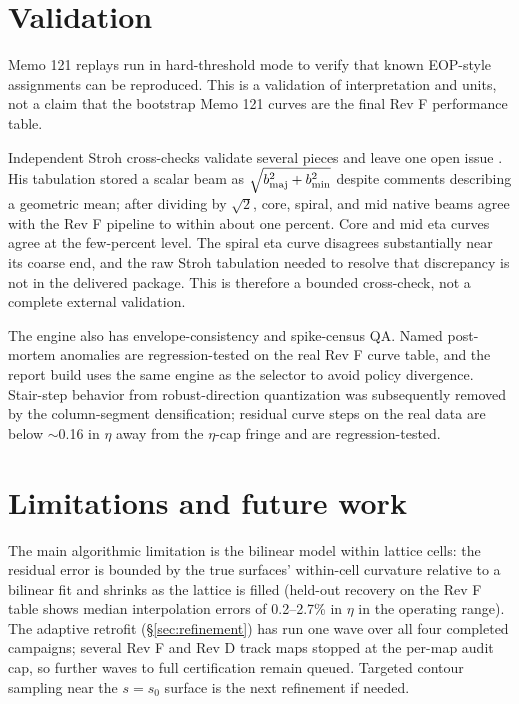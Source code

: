 \documentclass[11pt]{article}
\begin{document}
\section{Validation}
\label{sec:validation}

Memo 121 replays run in hard-threshold mode to verify that known EOP-style
assignments can be reproduced.  This is a validation of interpretation and
units, not a claim that the bootstrap Memo 121 curves are the final Rev F
performance table.

Independent Stroh cross-checks validate several pieces and leave one open
issue \cite{stroh}.  His tabulation stored a scalar beam as
$\sqrt{b_{\rm maj}^2+b_{\rm min}^2}$ despite comments describing a geometric
mean; after dividing by $\sqrt{2}$, core, spiral, and mid native beams agree
with the Rev F pipeline to within about one percent.  Core and mid eta curves
agree at the few-percent level.  The spiral eta curve disagrees substantially
near its coarse end, and the raw Stroh tabulation needed to resolve that
discrepancy is not in the delivered package.  This is therefore a bounded
cross-check, not a complete external validation.

The engine also has envelope-consistency and spike-census QA.  Named
post-mortem anomalies are regression-tested on the real Rev F curve table, and
the report build uses the same engine as the selector to avoid policy divergence.
Stair-step behavior from robust-direction quantization was subsequently
removed by the column-segment densification; residual curve steps on the real
data are below $\sim$0.16 in $\eta$ away from the $\eta$-cap fringe and are
regression-tested.

\section{Limitations and future work}
\label{sec:limitations}

The main algorithmic limitation is the bilinear model within lattice cells:
the residual error is bounded by the true surfaces' within-cell curvature
relative to a bilinear fit and shrinks as the lattice is filled (held-out
recovery on the Rev F table shows median interpolation errors of
0.2--2.7\% in $\eta$ in the operating range).  The adaptive retrofit
(\S\ref{sec:refinement}) has run one wave over all four completed
campaigns; several Rev F and Rev D track maps stopped at the per-map audit
cap, so further waves to full certification remain queued.  Targeted
contour sampling near the $s=s_0$ surface is the next refinement if
needed.
\end{document}
